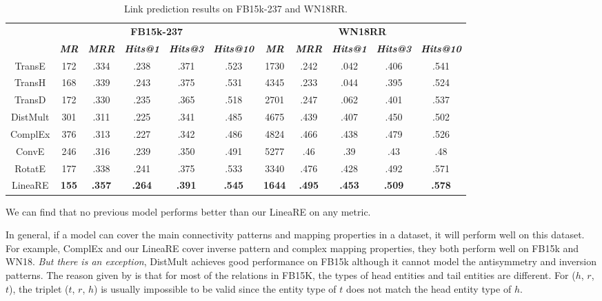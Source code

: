 \documentclass[conference]{IEEEtran}
\begin{document}
\begin{table*}[t]
	\caption{
		Link prediction results on FB15k-237 and WN18RR.
	}
	\label{FB15k-237WN18RR}
	\begin{center}
		\begin{tabular}{|c||c|c|c|c|c||c|c|c|c|c|}
			\hline
			\multirow{2}{*}{}
			& \multicolumn{5}{c||}{\textbf{FB15k-237}}
			& \multicolumn{5}{c|}{\textbf{WN18RR}}   \\
			\cline{2-6} \cline{7-11}
			& \textbf{\textit{MR}}  & \textbf{\textit{MRR}}	 & \textbf{\textit{Hits@1}}  & \textbf{\textit{Hits@3}}  & \textbf{\textit{Hits@10}}
			& \textbf{\textit{MR}}  & \textbf{\textit{MRR}}  & \textbf{\textit{Hits@1}}  & \textbf{\textit{Hits@3}}  & \textbf{\textit{Hits@10}} \\
			\hline
			TransE \cite{TransE}
			& 172	& .334	& .238	& .371	& .523
			& 1730	& .242	& .042	& .406	& .541  \\
			TransH \cite{TransH}
			& 168	& .339	& .243	& .375	& .531
			& 4345	& .233	& .044	& .395	& .524  \\
			TransD \cite{TransD}
			& 172	& .330	& .235	& .365	& .518
			& 2701	& .247	& .062	& .401	& .537  \\
			DistMult \cite{DistMult}
			& 301	& .311	& .225	& .341	& .485
			& 4675	& .439	& .407	& .450	& .502  \\
			ComplEx \cite{ComplEx}
			& 376	& .313	& .227	& .342	& .486
			& 4824	& .466	& .438	& .479	& .526  \\
			ConvE \cite{ConvE}
			& 246	& .316	& .239	& .350	& .491
			& 5277	& .46	& .39	& .43	& .48  \\
			RotatE \cite{RotatE}
			& 177	& .338	& .241	& .375	& .533
			& 3340	& .476	& .428	& .492	& .571  \\
			\hline
			LineaRE
			& \textbf{155}	& \textbf{.357}	& \textbf{.264}	& \textbf{.391}	& \textbf{.545}
			& \textbf{1644}	& \textbf{.495}	& \textbf{.453}	& \textbf{.509}	& \textbf{.578}  \\
			\hline
		\end{tabular}
	\end{center}
\end{table*}
We can find that no previous model performs better than our LineaRE on any metric.

In general, if a model can cover the main connectivity patterns and mapping properties in a dataset, it will perform well on this dataset. For example, ComplEx and our LineaRE cover inverse pattern and complex mapping properties, they both perform well on FB15k and WN18.
\textit{But there is an exception}, DistMult achieves good performance on FB15k although it cannot model the antisymmetry and inversion patterns. The reason given by \cite{RotatE} is that for most of the relations in FB15K, the types of head entities and tail entities are different. For ($h$, $r$, $t$), the triplet ($t$, $r$, $h$) is usually impossible to be valid since the entity type of $t$ does not match the head entity type of $h$.
\end{document}
